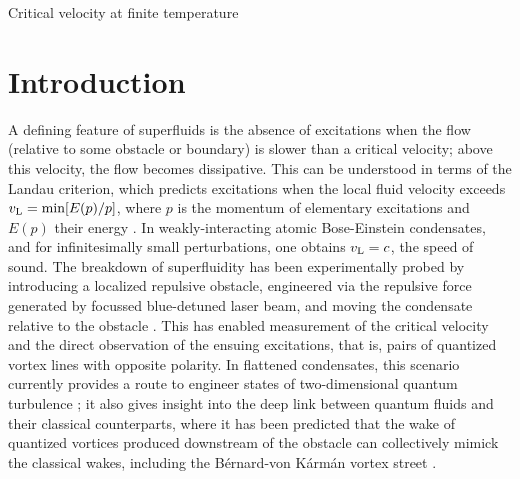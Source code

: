 \begin{chapter}{\label{cha:nonequib}Critical velocity at finite temperature}
\section{Introduction}
A defining feature of superfluids is the absence of excitations when the flow (relative to some obstacle or boundary) is slower than a critical velocity; above this velocity, the flow becomes dissipative.  This can be understood in terms of the Landau criterion, which predicts excitations when the local fluid velocity exceeds $v_{\rm L} = \textrm{min} [E(p)/p]$, where $p$ is the momentum of elementary excitations and $E(p)$ their energy \cite{NozieresPines}.  In weakly-interacting atomic Bose-Einstein
condensates, and for infinitesimally small perturbations, one obtains $v_{\rm L} = c$, the speed of sound.  The breakdown of superfluidity has been experimentally probed by introducing a localized repulsive obstacle, engineered via the repulsive force generated by focussed blue-detuned laser beam, and moving the condensate relative to the obstacle \cite{Neely,kwon_moon_14,kwon_2015a,kwon_2015b,Raman,Onofrio,Inouye,desbuquois_2012}.  This has enabled measurement of the critical velocity and the direct observation of the ensuing excitations, that is, pairs of quantized vortex lines with opposite polarity.
In flattened condensates, this scenario currently provides
a route to engineer states of two-dimensional quantum turbulence
\cite{Neely,kwon_moon_14}; it also gives
insight into the deep link between quantum fluids and their classical
counterparts, where it has been predicted that the wake of quantized
vortices produced downstream of the obstacle can collectively
mimick the classical wakes, including
the B{\' e}rnard-von K{\'a}rm{\' a}n vortex street
\cite{saito10,stagg_parker_14,reeves_2015}.


\end{chapter}
